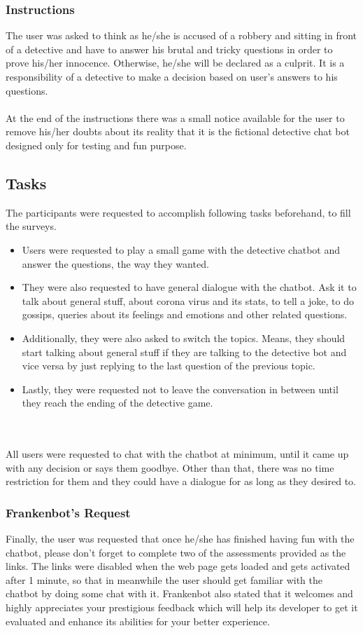 \subsubsection*{Instructions}
The user was asked to think as he/she is accused of a robbery and sitting in front of a detective and have to answer his brutal and tricky questions in order to prove his/her innocence. Otherwise, he/she will be declared as a culprit. It is a responsibility of a detective to make a decision based on user's answers to his questions.
\\~\\
At the end of the instructions there was a small notice available for the user to remove his/her doubts about its reality that it is the fictional detective chat bot designed only for testing and fun purpose.

\subsection{Tasks}
The participants were requested to accomplish following tasks beforehand, to fill the surveys.
\begin{itemize}
    \item Users were requested to play a small game with the detective chatbot and answer the questions, the way they wanted.
    \item They were also requested to have general dialogue with the chatbot. Ask it to talk about general stuff, about corona virus and its stats, to tell a joke, to do gossips, queries about its feelings and emotions and other related questions.
    \item Additionally, they were also asked to switch the topics. Means, they should start talking about general stuff if they are talking to the detective bot and vice versa by just replying to the last question of the previous topic.
    \item Lastly, they were requested not to leave the conversation in between until they reach the ending of the detective game. 
\end{itemize} 
\\~\\
All users were requested to chat with the chatbot at minimum, until it came up with any decision or says them goodbye. Other than that, there was no time restriction for them and they could have a dialogue for as long as they desired to.

\subsubsection*{Frankenbot's Request}
Finally, the user was requested that once he/she has finished having fun with the chatbot, please don't forget to complete two of the assessments provided as the links. The links were disabled when the web page gets loaded and gets activated after 1 minute, so that in meanwhile the user should get familiar with the chatbot by doing some chat with it. Frankenbot also stated that it welcomes and highly appreciates your prestigious feedback which will help its developer to get it evaluated and enhance its abilities for your better experience.

